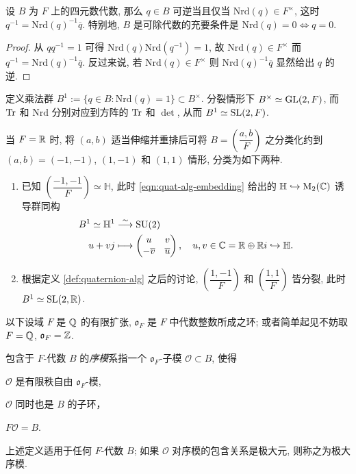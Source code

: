 \begin{proposition}
	设 $B$ 为 $F$ 上的四元数代数, 那么 $q \in B$ 可逆当且仅当 $\mathrm{Nrd}(q) \in F^\times$, 这时 $q^{-1} = \mathrm{Nrd}(q)^{-1} \overline{q}$. 特别地, $B$ 是可除代数的充要条件是 $\mathrm{Nrd}(q) = 0 \iff q = 0$.
\end{proposition}
\begin{proof}
	从 $qq^{-1} = 1$ 可得 $\mathrm{Nrd}(q) \mathrm{Nrd}(q^{-1}) = 1$, 故 $\mathrm{Nrd}(q) \in F^\times$ 而 $q^{-1} = \mathrm{Nrd}(q)^{-1} \overline{q}$. 反过来说, 若 $\mathrm{Nrd}(q) \in F^\times$ 则 $\mathrm{Nrd}(q)^{-1} \overline{q}$ 显然给出 $q$ 的逆.
\end{proof}

定义乘法群 $B^1 := \{q \in B: \text{Nrd}(q)=1 \} \subset B^\times$. 分裂情形下 $B^\times \simeq \operatorname{GL}(2,F)$, 而 $\operatorname{Tr}$ 和 $\text{Nrd}$ 分别对应到方阵的 $\operatorname{Tr}$ 和 $\det$, 从而 $B^1 \simeq \operatorname{SL}(2,F)$.

\begin{example}\label{eg:quaternion-real}
	当 $F = \mathbb{R}$ 时, 将 $(a,b)$ 适当伸缩并重排后可将 $B = \left( \dfrac{a,b}{F} \right)$ 之分类化约到 $(a,b) = (-1,-1)$, $(1, -1)$ 和 $(1, 1)$ 情形, 分类为如下两种.
	\begin{enumerate}
		\item 已知 $\left( \dfrac{-1, -1}{F} \right) \simeq \mathbb{H}$, 此时 \eqref{eqn:quat-alg-embedding} 给出的 $\mathbb{H} \hookrightarrow \operatorname{M}_2(\mathbb{C})$ 诱导群同构
		\begin{align*}
			B^1 \simeq \mathbb{H}^1 & \stackrel{\sim}{\longrightarrow} \operatorname{SU}(2) \\
			u + vj & \longmapsto \begin{pmatrix} u & v \\ -\overline{v} & \overline{u} \end{pmatrix}, \quad u,v \in \mathbb{C} = \mathbb{R} \oplus \mathbb{R} i \hookrightarrow \mathbb{H}.
		\end{align*}
		\item 根据定义 \ref{def:quaternion-alg} 之后的讨论, $\left( \dfrac{1, -1}{F} \right)$ 和 $\left( \dfrac{1, 1}{F} \right)$ 皆分裂, 此时 $B^1 \simeq \operatorname{SL}(2,\mathbb{R})$.
	\end{enumerate}
\end{example}

以下设域 $F$ 是 $\mathbb{Q}$ 的有限扩张, $\mathfrak{o}_F$ 是 $F$ 中代数整数所成之环; 或者简单起见不妨取 $F=\mathbb{Q}$, $\mathfrak{o}_F = \mathbb{Z}$.

\begin{definition}\label{def:order}
	包含于 $F$-代数 $B$ 的\emph{序模}系指一个 $\mathfrak{o}_F$-子模 $\mathcal{O} \subset B$, 使得
	\begin{compactitem}
		\item $\mathcal{O}$ 是有限秩自由 $\mathfrak{o}_F$-模,
		\item $\mathcal{O}$ 同时也是 $B$ 的子环，
		\item $F\mathcal{O} = B$.
	\end{compactitem}
	上述定义适用于任何 $F$-代数 $B$; 如果 $\mathcal{O}$ 对序模的包含关系是极大元, 则称之为极大序模.
\end{definition}

